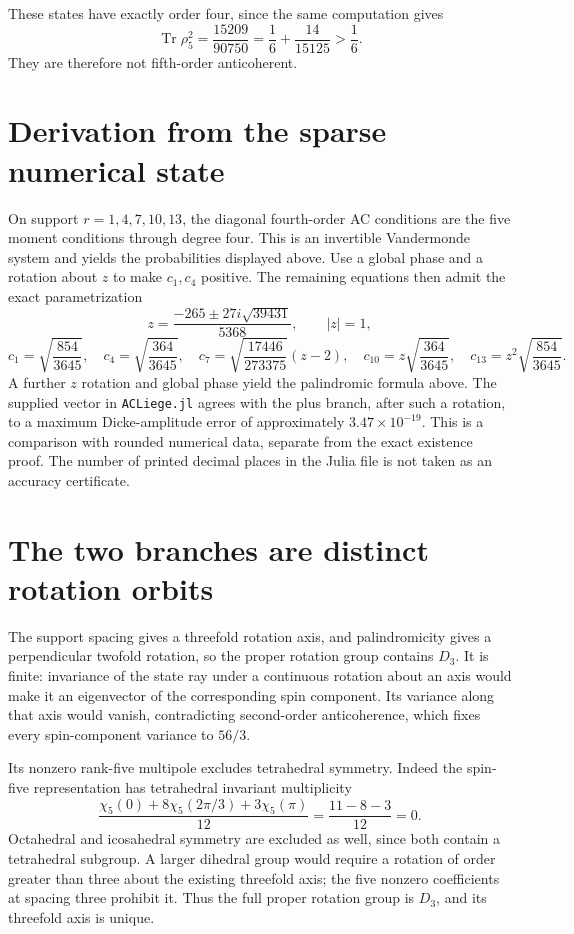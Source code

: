 \documentclass[11pt]{article}
\newcommand{\Tr}{\operatorname{Tr}}
\begin{document}
These states have exactly order four, since the same computation gives
\[
 \Tr\rho_5^2=\frac{15209}{90750}
 =\frac16+\frac{14}{15125}>\frac16.
\]
They are therefore not fifth-order anticoherent.

\section{Derivation from the sparse numerical state}
On support $r=1,4,7,10,13$, the diagonal fourth-order AC conditions are
the five moment conditions through degree four. This is an invertible
Vandermonde system and yields the probabilities displayed above.
Use a global phase and a rotation about $z$ to make $c_1,c_4$ positive.
The remaining equations then admit the exact parametrization
\[
 z=\frac{-265\mathbin\pm27i\sqrt{39431}}{5368},\qquad |z|=1,
\]
\[
 c_1=\sqrt{\frac{854}{3645}},\quad
 c_4=\sqrt{\frac{364}{3645}},\quad
 c_7=\sqrt{\frac{17446}{273375}}(z-2),\quad
 c_{10}=z\sqrt{\frac{364}{3645}},\quad
 c_{13}=z^2\sqrt{\frac{854}{3645}}.
\]
A further $z$ rotation and global phase yield the palindromic formula above.
The supplied vector in \texttt{ACLiege.jl} agrees with the plus branch, after
such a rotation, to a maximum Dicke-amplitude error of approximately
$3.47\times10^{-19}$. This is a comparison with rounded numerical data,
separate from the exact existence proof. The number of printed decimal places
in the Julia file is not taken as an accuracy certificate.

\section{The two branches are distinct rotation orbits}
The support spacing gives a threefold rotation axis, and palindromicity
gives a perpendicular twofold rotation, so the proper rotation group contains
$D_3$. It is finite: invariance of the state ray under a continuous rotation
about an axis would make it an eigenvector of the corresponding spin component.
Its variance along that axis would vanish, contradicting second-order
anticoherence, which fixes every spin-component variance to $56/3$.

Its nonzero rank-five multipole excludes tetrahedral symmetry. Indeed the
spin-five representation has tetrahedral invariant multiplicity
\[
 \frac{\chi_5(0)+8\chi_5(2\pi/3)+3\chi_5(\pi)}{12}
 =\frac{11-8-3}{12}=0.
\]
Octahedral and icosahedral symmetry are excluded as well, since both contain
a tetrahedral subgroup. A larger dihedral group would require a rotation
of order greater than three about the existing threefold axis; the five
nonzero coefficients at spacing three prohibit it. Thus the full proper
rotation group is $D_3$, and its threefold axis is unique.
\end{document}
